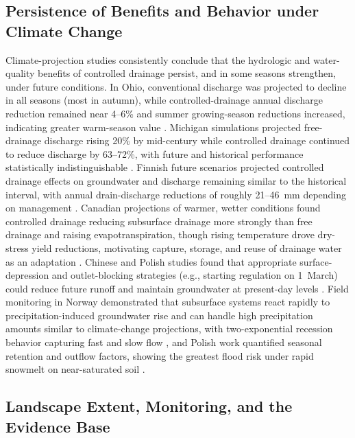 \subsection{Persistence of Benefits and Behavior under Climate Change}

Climate-projection studies consistently conclude that the hydrologic and
water-quality benefits of controlled drainage persist, and in some seasons
strengthen, under future conditions. In Ohio, conventional discharge was
projected to decline in all seasons (most in autumn), while controlled-drainage
annual discharge reduction remained near 4--6\% and summer growing-season
reductions increased, indicating greater warm-season value
\parencite{Pease2017}. Michigan simulations projected free-drainage discharge
rising 20\% by mid-century while controlled drainage continued to reduce
discharge by 63--72\%, with future and historical performance statistically
indistinguishable \parencite{BinShokrana2023}. Finnish future scenarios projected
controlled drainage effects on groundwater and discharge remaining similar to the
historical interval, with annual drain-discharge reductions of roughly
21--46~mm depending on management \parencite{Salla2022}. Canadian projections of
warmer, wetter conditions found controlled drainage reducing subsurface drainage
more strongly than free drainage and raising evapotranspiration, though rising
temperature drove dry-stress yield reductions, motivating capture, storage, and
reuse of drainage water as an adaptation \parencite{Ndulue2024}. Chinese and
Polish studies found that appropriate surface-depression and outlet-blocking
strategies (e.g., starting regulation on 1~March) could reduce future runoff and
maintain groundwater at present-day levels \parencite{Awad2021,Sojka2020}.
Field monitoring in Norway demonstrated that subsurface systems react rapidly to
precipitation-induced groundwater rise and can handle high precipitation amounts
similar to climate-change projections, with two-exponential recession behavior
capturing fast and slow flow \parencite{Deelstra2015}, and Polish work quantified
seasonal retention and outflow factors, showing the greatest flood risk under
rapid snowmelt on near-saturated soil \parencite{Szejba2020}.

\subsection{Landscape Extent, Monitoring, and the Evidence Base}

